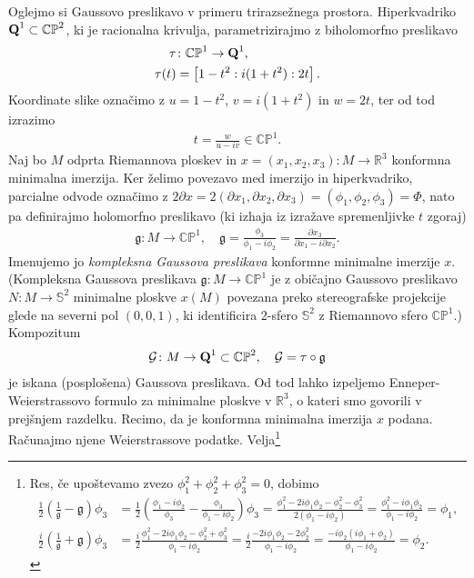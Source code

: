 \documentclass[12pt,a4paper,twoside]{article}
\theoremstyle{definition} %
\theoremstyle{plain} %
\numberwithin{equation}{section}  %
\begin{document}
Oglejmo si Gaussovo preslikavo v primeru trirazsežnega prostora. Hiperkvadriko $\textup{\textbf{Q}}^{1} \subset \mathbb{CP}^{2}$, ki je racionalna krivulja, parametrizirajmo z biholomorfno preslikavo 
\begin{align}
\tau &\colon \mathbb{CP}^{1} \to \textup{\textbf{Q}}^{1}, \nonumber \\
\tau (t) &= \left[ 1-t^2 : i(1+t^2) : 2t \right].
\end{align}
Koordinate slike označimo z $u = 1-t^2$, $v = i(1+t^2)$ in $w = 2t$, ter od tod izrazimo 
\begin{gather*}
t = \frac{w}{u-iv} \in \mathbb{CP}^{1}.
\end{gather*}
Naj bo $M$ odprta Riemannova ploskev in $x = (x_1,x_2,x_3) \colon M \to \mathbb{R}^{3}$ konformna minimalna imerzija. Ker želimo povezavo med imerzijo in hiperkvadriko, parcialne odvode označimo z $2 \partial x = 2 (\partial x_1, \partial x_2, \partial x_3) = (\phi_1, \phi_2, \phi_3) = \Phi$, nato pa definirajmo holomorfno preslikavo (ki izhaja iz izražave spremenljivke $t$ zgoraj)
\begin{gather}
\mathfrak{g} \colon M \to \mathbb{CP}^{1}, \quad \mathfrak{g} = \frac{\phi_3}{\phi_1 - i\phi_2} = \frac{\partial x_3}{\partial x_1 - i \partial x_2}.
\end{gather}
Imenujemo jo \emph{kompleksna Gaussova preslikava} konformne minimalne imerzije $x$.
(Kompleksna Gaussova preslikava $\mathfrak{g} \colon M \to \mathbb{CP}^{1}$ je z običajno Gaussovo preslikavo $N \colon M \to \mathbb{S}^2$ minimalne ploskve $x(M)$ povezana preko stereografske projekcije glede na severni pol $(0,0,1)$, ki identificira $2$-sfero $\mathbb{S}^2$ z Riemannovo sfero $\mathbb{CP}^{1}$.)
Kompozitum 
\begin{align}
\mathcal{G} \colon M \to \textup{\textbf{Q}}^{1} \subset \mathbb{CP}^{2}, \quad \mathcal{G} = \tau \circ \mathfrak{g}
\end{align}
je iskana (posplošena) Gaussova preslikava.\newline
Od tod lahko izpeljemo Enneper-Weierstrassovo formulo za minimalne ploskve v $\mathbb{R}^{3}$, o kateri smo govorili v prejšnjem razdelku. 
Recimo, da je konformna minimalna imerzija $x$ podana. Računajmo njene Weierstrassove podatke. 
Velja\footnote{Res, če upoštevamo zvezo $\phi_{1}^2 + \phi_{2}^2 + \phi_{3}^2 = 0$, dobimo
\begin{align*}
\frac{1}{2} \left(\frac{1}{\mathfrak{g}} - \mathfrak{g} \right) \phi_3 &= \frac{1}{2} \left( \frac{\phi_1 - i\phi_2}{\phi_3} - \frac{\phi_3}{\phi_1 - i\phi_2} \right) \phi_3 = \frac{\phi_{1}^2 - 2i\phi_1 \phi_2 - \phi_{2}^2 - \phi_{3}^2}{2(\phi_1 - i\phi_2)} = \frac{\phi_{1}^2 - i\phi_1\phi_2}{\phi_1 - i\phi_2} = \phi_1, \\
%
\frac{i}{2} \left(\frac{1}{\mathfrak{g}} + \mathfrak{g} \right) \phi_3 &= \frac{i}{2} \frac{\phi_{1}^2 - 2i\phi_1 \phi_2 - \phi_{2}^2 + \phi_{3}^2}{\phi_1 - i\phi_2} = \frac{i}{2} \frac{-2i\phi_1 \phi_2 - 2\phi_{2}^2}{\phi_1 - i\phi_2} = \frac{-i\phi_2(i\phi_1 + \phi_2)}{\phi_1 - i\phi_2} = \phi_2.
\end{align*}
}
\end{document}
